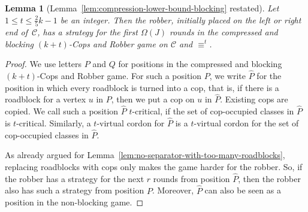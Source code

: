 \documentclass[10pt,a4paper]{article}
\newcommand{\comp}{\equiv}
\newcommand{\grid}{\mathcal{C}}
\newtheorem{lemma}[theorem]{Lemma}
\begin{document}
\begin{lemma}[Lemma~\ref{lem:compression-lower-bound-blocking} restated]
	Let $1\leq t \leq \frac{2}{5}k -1$ be an integer.
	Then the robber, initially placed on the left or right end of~$\grid$,
	has a strategy for the first $\Omega(J)$
	rounds in the compressed and blocking $(k+t)$-Cops and Robber game
	on $\grid$ and $\comp^t$.
\end{lemma}
%
\begin{proof}
We use letters $P$ and $Q$ for positions in the compressed and blocking $(k+t)$-Cops and Robber game.
	For such a position $P$, we write $\hat{P}$ for the position
	in which every roadblock is turned into a cop,
	that is, if there is a roadblock for a vertex $u$ in $P$,
	then we put a cop on $u$ in $\hat{P}$.
	Existing cops are copied.
	We call such a position $\hat{P}$ $t$-critical,
	if the set of cop-occupied classes in $\hat{P}$ is $t$-critical.
	Similarly, a $t$-virtual cordon for $\hat{P}$
	is a $t$-virtual cordon for the set of cop-occupied classes in $\hat{P}$.
	
	As already argued for Lemma~\ref{lem:no-separator-with-too-many-roadblocks},
	replacing roadblocks with cops only makes the game  harder for the robber.
	So, if the robber has a strategy for the next $r$ rounds from position $\hat{P}$,
	then the robber also has such a strategy from position $P$.
	Moreover, $\hat{P}$ can also be seen as a position
	in the non-blocking game.
	

\end{proof}
\end{document}
